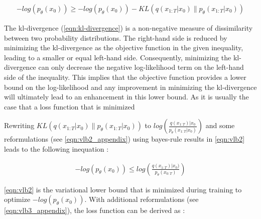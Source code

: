 \begin{equation}
  \label{eqn:vlb}
  \begin{align*}
    -log(p_\theta(x_0)) \geq -log(p_\theta(x_0)) - KL(q(x_{1:T}|x_0) \parallel p_\theta(x_{1:T}|x_0))
  \end{align*}
\end{equation}

The \gls{kl}-divergence (\autoref{eqn:kl-divergence}) is a non-negative measure of dissimilarity between two probability distributions. 
The right-hand side is reduced by minimizing the \gls{kl}-divergence as the objective function in the given inequality, leading to a smaller or equal left-hand side. 
Consequently, minimizing the \gls{kl}-divergence can only decrease the negative log-likelihood term on the left-hand side of the inequality. 
This implies that the objective function provides a lower bound on the log-likelihood and any improvement in minimizing the \gls{kl}-divergence will ultimately lead to an enhancement in this lower bound.
As it is usually the case that a loss function that is minimized

Rewriting $KL(q(x_{1:T}|x_0) \parallel p_\theta(x_{1:T}|x_0))$ to $log(\frac{q(x_{1:T})|x_0}{p_\theta(x_{1:T}|x_0)})$ and some reformulations (see \autoref{eqn:vlb2_appendix}) using bayes-rule results in \autoref{eqn:vlb2} leads to the following inequation \cite{ho2020DenoisingDiffusionProbabilistic}:

\begin{equation}
  \label{eqn:vlb2}
  \begin{align*}
    -log(p_\theta(x_0)) \leq log(\frac{q(x_{1:T})|x_0)}{p_\theta(x_{0:T})})
  \end{align*}
\end{equation}

\autoref{eqn:vlb2} is the variational lower bound that is minimized during training to optimize $-log(p_\theta(x_0))$.
With additional reformulations (see \autoref{eqn:vlb3_appendix}), the loss function can be derived as \cite{ho2020DenoisingDiffusionProbabilistic}:


